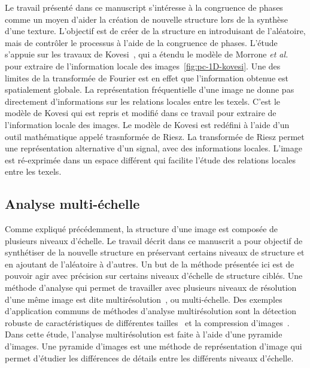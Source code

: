 Le travail présenté dans ce manuscript s'intéresse à la congruence de phases comme un moyen d'aider la création de nouvelle structure lors de la synthèse d'une texture. L'objectif est de créer de la structure en introduisant de l'aléatoire, mais de contrôler le processus à l'aide de la congruence de phases. L'étude s'appuie sur les travaux de Kovesi~\cite{kovesi_image_1995}, qui a étendu le modèle de Morrone \textit{et al.}~\cite{morrone_feature_1987, morrone_feature_1988} pour extraire de l'information locale des images~\ref{fig:pc-1D-kovesi}. Une des limites de la transformée de Fourier est en effet que l'information obtenue est spatialement globale. La représentation fréquentielle d'une image ne donne pas directement d'informations sur les relations locales entre les texels. C'est le modèle de Kovesi qui est repris et modifié dans ce travail pour extraire de l'information locale des images. Le modèle de Kovesi est redéfini à l'aide d'un outil mathématique appelé trasnformée de Riesz. La transformée de Riesz permet une représentation alternative d'un signal, avec des informations locales. L'image est ré-exprimée dans un espace différent qui facilite l'étude des relations locales entre les texels.

\subsection{Analyse multi-échelle}

Comme expliqué précédemment, la structure d'une image est composée de plusieurs niveaux d'échelle. Le travail décrit dans ce manuscrit a pour objectif de synthétiser de la nouvelle structure en préservant certains niveaux de structure et en ajoutant de l'aléatoire à d'autres. Un but de la méthode présentée ici est de pouvoir agir avec précision sur certains niveaux d'échelle de structure ciblés. Une méthode d'analyse qui permet de travailler avec plusieurs niveaux de résolution d'une même image est dite multirésolution~\cite{mallat_theory_1989}, ou multi-échelle. Des exemples d'application communs de méthodes d'analyse multirésolution sont la détection robuste de caractéristiques de différentes tailles~\cite{park_multiresolution_2010} et la compression d'images~\cite{averbuch_image_1996}. Dans cette étude, l'analyse multirésolution est faite à l'aide d'une pyramide d'images. Une pyramide d'images est une méthode de représentation d'image qui permet d'étudier les différences de détails entre les différents niveaux d'échelle.
